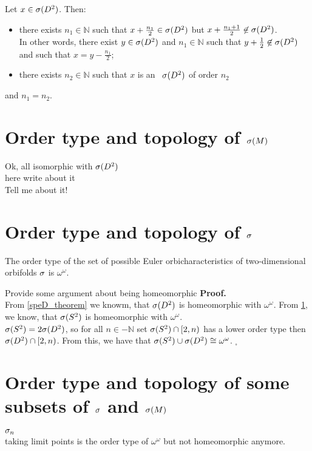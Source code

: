 \begin{corollary}\label{predescors}
Let $x \in {{\sigma}(D^2)}$. Then:
\begin{itemize}
\item there exists $n_1 \in \mathbb{N}$ such that $x + \frac{n_1}{2} \in {{\sigma}(D^2)}$ 
but $x+\frac{n_1+1}{2} \not\in {{\sigma}(D^2)}$. \\ In other words, there exist $y \in {{\sigma}(D^2)}$ and 
$n_1 \in \mathbb{N}$ such that 
$y + \frac{1}{2} \not\in {{\sigma}(D^2)}$ and such that $x = y - \frac{n_1}{2}$;
\item there exists $n_2 \in \mathbb{N}$ such that $x$ is an \apots\ ${{\sigma}(D^2)}$ of 
order $n_2$
\end{itemize}
and $n_1 = n_2$.
\end{corollary}

\section{Order type and topology of ${{\sigma}(M)}$}\label{all_spectra_are_isomorphic}
Ok, all isomorphic with ${{\sigma}(D^2)}$ \\
here write about it \\
Tell me about it!


\section{Order type and topology of ${\sigma}$}
\begin{theorem}
The order type of the set of possible Euler orbicharacteristics of two-dimensional orbifolds 
${\sigma}$ is $\omega^\omega$. 
\end{theorem}
Provide some argument about being homeomorphic 
\noindent\textbf{Proof.} \\
From \ref{speD_theorem} we knowm, that ${{\sigma}(D^2)}$ is homeomorphic with $\omega^\omega$. From 
\ref{all_spectra_are_isomorphic}, we know, that ${{\sigma}(S^2)}$ is homeomorphic 
with $\omega^\omega$. \\
${{\sigma}(S^2)} = 2{{\sigma}(D^2)}$, so for all $n\in -\mathbb{N}$ set ${{\sigma}(S^2)} \cap [2,n)$ has a lower order type then 
${{\sigma}(D^2)}\cap [2,n)$. From this, we have that ${{\sigma}(S^2)} \cup {{\sigma}(D^2)} \cong \omega^\omega$. $_\square$ \\[4pt]

\section{Order type and topology of some subsets of ${\sigma}$ and ${\sigma}(M)$}
${\sigma}_n$ \\
taking limit points is the order type of $\omega^\omega$ but not homeomorphic anymore. 




